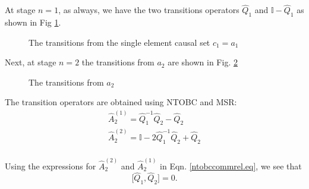 \documentclass[11pt]{article}
\newcommand{\hA}{\hat { A}}
\newcommand{\hQ}{\hat Q}
\newcommand*{\drawprobleft}[4][]{%
  \draw[prob arrow] (#2)-- node[above left, below, midway, #1] {$#3$} (#4);
}
\newcommand*{\drawprobright}[4][]{%
  \draw[prob arrow] (#2)-- node[above right,below, midway, #1] {$#3$} (#4);
}
\newcommand*{\drawprobrighttop}[4][]{%
  \draw[prob arrow] (#2)-- node[right=0.2,midway, #1] {$#3$} (#4);
}
\newcommand{\achain}{a}
\newcommand{\id}{\mathbb I}
\newcommand{\h}{\hat}
\begin{document}
At stage $n=1$, as always,  we have the two transitions operators $\hQ_1$  and
$\id - \hQ_1$  as shown in Fig \ref{cone.fig}. 
\begin{figure}[H]
 \centering
\caption{The transitions from the single element causal set
  $c_1=\achain_1$ } \label{cone.fig} 
 \end{figure}
 Next, at  stage $n=2$ the transitions  from $\achain_2$ are shown in
 Fig. \ref{antichaintwo.fig} 
\begin{figure}[H]
 \centering
\caption{The transitions from $\achain_2$ } \label{antichaintwo.fig} 
 \end{figure}
The transition operators are  obtained using NTOBC and MSR: 
\begin{eqnarray} 
\h A_2^{(1)} = \hQ_1^{-1} \hQ_2 - \hQ_2\nonumber \\
\h A_2^{(2)}= \id - 2 \hQ_1^{-1} \hQ_2 + \hQ_2 \nonumber \\
\end{eqnarray}

Using the expressions for $\hA_2^{(2)}$ and $\hA_2^{(1)}$ in 
Eqn. \eqref{ntobccommrel.eq}, we see that 
\begin{equation}
\bigl[ \hQ_1,\hQ_2\bigr]=0.  \label{onetwoQ.eq} 
\end{equation}
\end{document}
